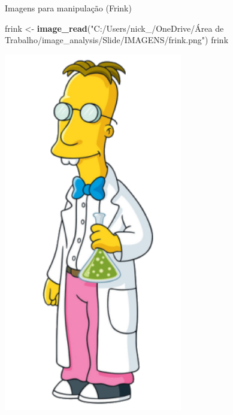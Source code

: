 \documentclass[
  ignorenonframetext,
]{beamer}
\newenvironment{Shaded}{\begin{snugshade}}{\end{snugshade}}
\newcommand{\KeywordTok}[1]{\textcolor[rgb]{0.13,0.29,0.53}{\textbf{#1}}}
\newcommand{\NormalTok}[1]{#1}
\newcommand{\StringTok}[1]{\textcolor[rgb]{0.31,0.60,0.02}{#1}}
\begin{document}
\begin{frame}[fragile]{Imagens para manipulação (Frink)}
\protect\hypertarget{imagens-para-manipulauxe7uxe3o-frink}{}

\begin{Shaded}
\begin{Highlighting}[]
\NormalTok{frink <-}\StringTok{ }\KeywordTok{image_read}\NormalTok{(}\StringTok{"C:/Users/nick_/OneDrive/Área de Trabalho/image_analysis/Slide/IMAGENS/frink.png"}\NormalTok{)}
\NormalTok{frink}
\end{Highlighting}
\end{Shaded}

\includegraphics[width=3.06in]{SLIDES_files/figure-beamer/5-1}

\end{frame}
\end{document}
